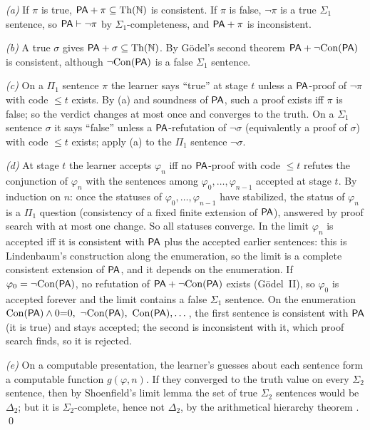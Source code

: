 \emph{(a)} If $\pi$ is true, $\mathsf{PA}+\pi\subseteq\mathrm{Th}(\mathbb{N})$ is consistent. If $\pi$ is false, $\neg\pi$ is a true $\Sigma_1$ sentence, so $\mathsf{PA}\vdash\neg\pi$ by $\Sigma_1$-completeness, and $\mathsf{PA}+\pi$ is inconsistent.

\emph{(b)} A true $\sigma$ gives $\mathsf{PA}+\sigma\subseteq\mathrm{Th}(\mathbb{N})$. By G\"odel's second theorem $\mathsf{PA}+\neg\mathrm{Con}(\mathsf{PA})$ is consistent, although $\neg\mathrm{Con}(\mathsf{PA})$ is a false $\Sigma_1$ sentence.

\emph{(c)} On a $\Pi_1$ sentence $\pi$ the learner says ``true'' at stage $t$ unless a $\mathsf{PA}$-proof of $\neg\pi$ with code $\le t$ exists. By (a) and soundness of $\mathsf{PA}$, such a proof exists iff $\pi$ is false; so the verdict changes at most once and converges to the truth. On a $\Sigma_1$ sentence $\sigma$ it says ``false'' unless a $\mathsf{PA}$-refutation of $\neg\sigma$ (equivalently a proof of $\sigma$) with code $\le t$ exists; apply (a) to the $\Pi_1$ sentence $\neg\sigma$.

\emph{(d)} At stage $t$ the learner accepts $\varphi_n$ iff no $\mathsf{PA}$-proof with code $\le t$ refutes the conjunction of $\varphi_n$ with the sentences among $\varphi_0,\dots,\varphi_{n-1}$ accepted at stage $t$. By induction on $n$: once the statuses of $\varphi_0,\dots,\varphi_{n-1}$ have stabilized, the status of $\varphi_n$ is a $\Pi_1$ question (consistency of a fixed finite extension of $\mathsf{PA}$), answered by proof search with at most one change. So all statuses converge. In the limit $\varphi_n$ is accepted iff it is consistent with $\mathsf{PA}$ plus the accepted earlier sentences: this is Lindenbaum's construction along the enumeration, so the limit is a complete consistent extension of $\mathsf{PA}$, and it depends on the enumeration. If $\varphi_0=\neg\mathrm{Con}(\mathsf{PA})$, no refutation of $\mathsf{PA}+\neg\mathrm{Con}(\mathsf{PA})$ exists (G\"odel~II), so $\varphi_0$ is accepted forever and the limit contains a false $\Sigma_1$ sentence. On the enumeration $\Con(\PA)\wedge0{=}0,\ \neg\Con(\PA),\ \Con(\PA),\dots$, the first sentence is consistent with $\mathsf{PA}$ (it is true) and stays accepted; the second is inconsistent with it, which proof search finds, so it is rejected.

\emph{(e)} On a computable presentation, the learner's guesses about each sentence form a computable function $g(\varphi,n)$. If they converged to the truth value on every $\Sigma_2$ sentence, then by Shoenfield's limit lemma \citep{shoenfield1959degrees} the set of true $\Sigma_2$ sentences would be $\Delta_2$; but it is $\Sigma_2$-complete, hence not $\Delta_2$, by the arithmetical hierarchy theorem \citep[\S57]{kleene1952introduction}. \qed

